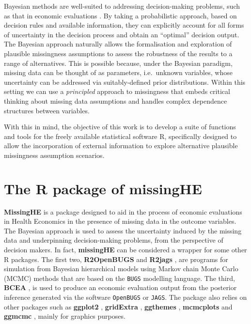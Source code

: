 \documentclass[]{article}
\begin{document}
Bayesian methods are well-suited to addressing decision-making problems,
such as that in economic evaluations \citep{Briggsb, Briggsc, Baioa}. By
taking a probabilistic approach, based on decision rules and available
information, they can explicitly account for all forms of uncertainty in
the decision process and obtain an ``optimal'' decision output. The
Bayesian approach naturally allows the formalisation and exploration of
plausible missingness assumptions to assess the robustness of the
results to a range of alternatives. This is possible because, under the
Bayesian paradigm, missing data can be thought of as parameters,
i.e.~unknown variables, whose uncertainty can be addressed via
suitably-defined prior distributions. Within this setting we can use a
\textit{principled} approach to missingness that embeds critical
thinking about missing data assumptions and handles complex dependence
structures between variables.

With this in mind, the objective of this work is to develop a suite of
functions and tools for the freely available statistical software R,
specifically designed to allow the incorporation of external information
to explore alternative plausible missingness assumption scenarios.

\section{The R package of missingHE}\label{the-r-package-of-missinghe}

\textbf{MissingHE} is a package designed to aid in the process of
economic evaluations in Health Economics
in the presence of missing data in the outcome variables. The Bayesian approach is used 
to assess the uncertainty induced by the missing data and underpinning decision-making problems,
from the perspective of decision makers. In fact, \textbf{missingHE} can be considered a wrapper for some
other R packages. The first two, \textbf{R2OpenBUGS} \citep{GelmanBUGS}
and \textbf{R2jags} \citep{Su}, are programs for simulation from
Bayesian hierarchical models using Markov chain Monte Carlo (MCMC)
methods that are based on the \texttt{BUGS} modelling language. The
third, \textbf{BCEA} \citep{BCEA}, is used to produce an economic
evaluation output from the posterior inference generated via the
software \texttt{OpenBUGS} or \texttt{JAGS}. The package also relies on
other packages such as \textbf{ggplot2} \citep{Wickham},
\textbf{gridExtra} \citep{Auguie}, \textbf{ggthemes} \citep{Arnold},
\textbf{mcmcplots} \citep{Curtis} and \textbf{ggmcmc} \citep{Marin},
mainly for graphics purposes.
\end{document}
